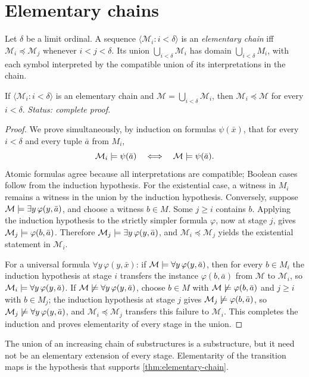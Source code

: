 \section{Elementary chains}
\label{sec:maps-elementarity-05}

\begin{definition}
Let \(\delta\) be a limit ordinal.  A sequence
\(\langle\mathcal M_i:i<\delta\rangle\) is an \emph{elementary chain} iff
\(\mathcal M_i\preccurlyeq\mathcal M_j\) whenever \(i<j<\delta\).
Its union \(\bigcup_{i<\delta}\mathcal M_i\) has domain
\(\bigcup_{i<\delta}M_i\), with each symbol interpreted by the compatible
union of its interpretations in the chain.
\end{definition}

\begin{theorem}
\label{thm:elementary-chain}
If \(\langle\mathcal M_i:i<\delta\rangle\) is an elementary chain and
\(\mathcal M=\bigcup_{i<\delta}\mathcal M_i\), then
\(\mathcal M_i\preccurlyeq\mathcal M\) for every \(i<\delta\).
\textit{Status: complete proof.}
\end{theorem}

\begin{proof}
We prove simultaneously, by induction on formulas \(\psi(\bar x)\), that for
every \(i<\delta\) and every tuple \(\bar a\) from \(M_i\),
\[
  \mathcal M_i\models\psi(\bar a)
  \quad\Longleftrightarrow\quad
  \mathcal M\models\psi(\bar a).
\]
Atomic formulas agree because all interpretations are compatible; Boolean
cases follow from the induction hypothesis.  For the existential case, a
witness in \(M_i\) remains a witness in the union by the induction hypothesis.
Conversely, suppose
\(\mathcal M\models\exists y\,\varphi(y,\bar a)\), and choose a witness
\(b\in M\).  Some \(j\geq i\) contains \(b\).  Applying the induction
hypothesis to the strictly simpler formula \(\varphi\), now at stage \(j\),
gives \(\mathcal M_j\models\varphi(b,\bar a)\).  Therefore
\(\mathcal M_j\models\exists y\,\varphi(y,\bar a)\), and
\(\mathcal M_i\preccurlyeq\mathcal M_j\) yields the existential statement in
\(\mathcal M_i\).

For a universal formula \(\forall y\,\varphi(y,\bar x)\): if
\(\mathcal M\models\forall y\,\varphi(y,\bar a)\), then for every
\(b\in M_i\) the induction hypothesis at stage \(i\) transfers the
instance \(\varphi(b,\bar a)\) from \(\mathcal M\) to
\(\mathcal M_i\), so \(\mathcal M_i\models\forall y\,\varphi(y,\bar a)\).
If \(\mathcal M\not\models\forall y\,\varphi(y,\bar a)\), choose
\(b\in M\) with \(\mathcal M\not\models\varphi(b,\bar a)\) and
\(j\geq i\) with \(b\in M_j\); the induction hypothesis at stage \(j\)
gives \(\mathcal M_j\not\models\varphi(b,\bar a)\), so
\(\mathcal M_j\not\models\forall y\,\varphi(y,\bar a)\), and
\(\mathcal M_i\preccurlyeq\mathcal M_j\) transfers this failure to
\(\mathcal M_i\).  This completes the induction and proves elementarity of
every stage in the union.
\end{proof}

\begin{warning}
The union of an increasing chain of substructures is a substructure, but it
need not be an elementary extension of every stage.  Elementarity of the
transition maps is the hypothesis that supports
\cref{thm:elementary-chain}.
\end{warning}

